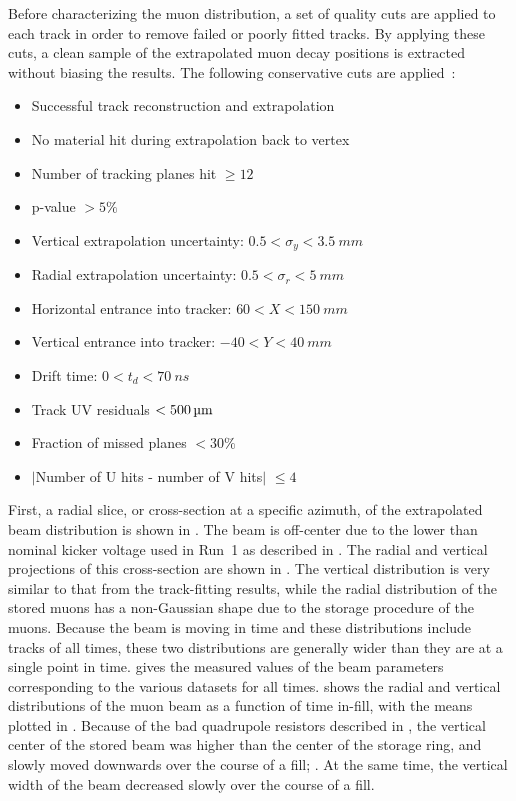 Before characterizing the muon distribution, a set of quality cuts are applied to each track in order to remove failed or poorly fitted tracks. By applying these cuts, a clean sample of the extrapolated muon decay positions is extracted without biasing the results. The following conservative cuts are applied~\cite{trackcuts1,trackcuts2}:
\begin{itemize}
    \item{Successful track reconstruction and extrapolation}
    \item{No material hit during extrapolation back to vertex}
    \item{Number of tracking planes hit $\geq 12$}
    \item{p-value $> 5\%$}
    \item{Vertical extrapolation uncertainty: $0.5 < \sigma_{y} < \SI{3.5}{mm}$}
    \item{Radial extrapolation uncertainty: $0.5 < \sigma_{r} < \SI{5}{mm}$}
    \item{Horizontal entrance into tracker: $60 < X < \SI{150}{mm}$}
    \item{Vertical entrance into tracker: $-40 < Y < \SI{40}{mm}$}
    \item{Drift time: $0 < t_{d} < \SI{70}{ns}$}
    \item{Track UV residuals $< \SI{500}{\micro m}$}
    \item{Fraction of missed planes $< 30\%$}
    \item{$|$Number of U hits - number of V hits$|$ $\leq 4$}
\end{itemize}



First, a radial slice, or cross-section at a specific azimuth, of the extrapolated beam distribution is shown in . The beam is off-center due to the lower than nominal kicker voltage used in Run~1 as described in . The radial and vertical projections of this cross-section are shown in . The vertical distribution is very similar to that from the track-fitting results, while the radial distribution of the stored muons has a non-Gaussian shape due to the storage procedure of the muons. Because the beam is moving in time and these distributions include tracks of all times, these two distributions are generally wider than they are at a single point in time.  gives the measured values of the beam parameters corresponding to the various datasets for all times.  shows the radial and vertical distributions of the muon beam as a function of time in-fill, with the means plotted in . Because of the bad quadrupole resistors described in , the vertical center of the stored beam was higher than the center of the storage ring, and slowly moved downwards over the course of a fill; . At the same time, the vertical width of the beam decreased slowly over the course of a fill.



